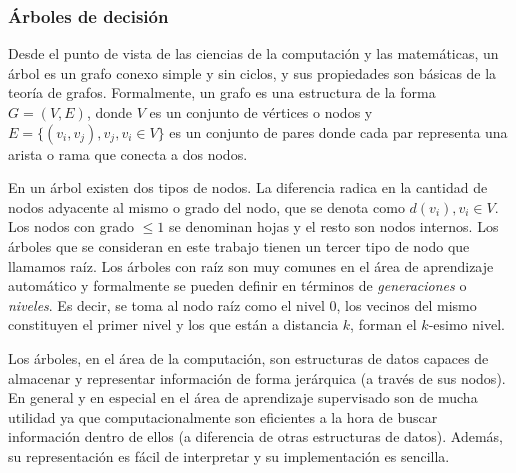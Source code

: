 \subsubsection{Árboles de decisión}
\label{subsection:arboles_decision}


Desde el punto de vista de las ciencias de la computación y las matemáticas, un
árbol es un grafo conexo simple y sin ciclos, y sus propiedades son básicas de
la teoría de grafos. Formalmente, un grafo es una estructura de la forma $G=(V,E)$, donde $V$ es un conjunto de vértices o nodos y $E=\{ (v_i, v_j), v_j,v_i \in V \}$ es un
conjunto de pares donde cada par representa una arista o rama que conecta a dos nodos.


	En un árbol existen dos tipos de nodos. La diferencia radica en la cantidad de nodos adyacente al mismo o grado del nodo, que se denota como $d(v_i), v_i \in V$. Los nodos con grado $\leq 1$ se denominan hojas y el resto son nodos internos. Los árboles que se consideran en este trabajo tienen un tercer tipo de nodo que llamamos raíz. Los árboles con raíz son muy comunes en el área de aprendizaje automático y formalmente se pueden definir en términos de \textit{generaciones} o \textit{niveles}. Es decir, se toma al nodo raíz como el nivel 0, los vecinos del mismo constituyen el primer nivel y los que están a distancia $k$, forman el $k$-esimo nivel.

	Los árboles, en el área de la computación, son estructuras de datos capaces de almacenar y representar información de forma jerárquica (a través de sus nodos). En general y en especial en el área de aprendizaje supervisado son de mucha utilidad ya que computacionalmente son eficientes a la hora de buscar información dentro de ellos (a diferencia de otras estructuras de datos). Además, su representación es fácil de interpretar y su implementación es sencilla.

